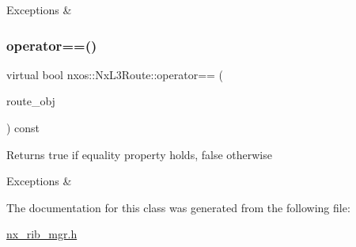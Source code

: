 \begin{DoxyExceptions}{Exceptions}
{\em } & \\
\hline
\end{DoxyExceptions}
\mbox{\label{classnxos_1_1_nx_l3_route_a1680de6899caf8fa1be3ecfad131cd25}} 
\subsubsection{\texorpdfstring{operator==()}{operator==()}}
{\footnotesize\ttfamily virtual bool nxos\+::\+Nx\+L3\+Route\+::operator== (\begin{DoxyParamCaption}\item[{\mbox{\hyperlink{classnxos_1_1_nx_l3_route}{Nx\+L3\+Route}} const \&}]{route\+\_\+obj }\end{DoxyParamCaption}) const\hspace{0.3cm}{\ttfamily [pure virtual]}}

\begin{DoxyReturn}{Returns}
true if equality property holds, false otherwise
\end{DoxyReturn}

\begin{DoxyCode}
\end{DoxyCode}



\begin{DoxyExceptions}{Exceptions}
{\em } & \\
\hline
\end{DoxyExceptions}


The documentation for this class was generated from the following file\+:\begin{DoxyCompactItemize}
\item 
\mbox{\hyperlink{nx__rib__mgr_8h}{nx\+\_\+rib\+\_\+mgr.\+h}}\end{DoxyCompactItemize}
